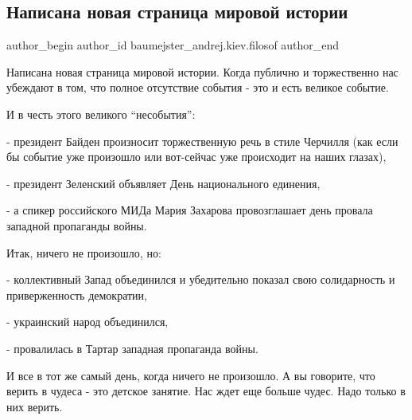  
 
 
 
 
 
\subsection{Написана новая страница мировой истории}
\label{sec:16_02_2022.fb.baumejster_andrej.kiev.filosof.1.napisana_novaja_stranica_istorii}
 
\ifcmt
 author_begin
   author_id baumejster_andrej.kiev.filosof
 author_end
\fi

Написана новая страница мировой истории. Когда публично и торжественно нас
убеждают в том, что полное отсутствие события - это и есть великое событие. 

И в честь этого великого \enquote{несобытия}:

- президент Байден произносит торжественную речь в стиле Черчилля (как если бы
событие уже произошло или вот-сейчас уже происходит на наших глазах), 

- президент Зеленский объявляет День национального единения, 

- а спикер российского МИДа Мария Захарова провозглашает день провала западной
пропаганды войны. 

Итак, ничего не произошло, но: 

- коллективный Запад объединился и убедительно показал свою солидарность и
приверженность демократии, 

- украинский народ объединился, 

- провалилась в Тартар западная пропаганда войны. 

И все в тот же самый день, когда ничего не произошло. А вы говорите, что верить
в чудеса - это детское занятие. Нас ждет еще больше чудес. Надо только в них
верить.
